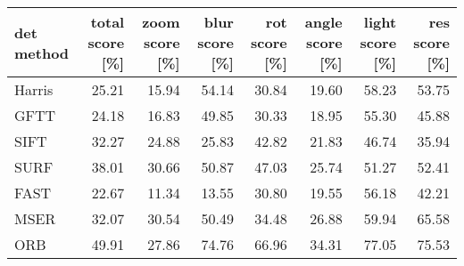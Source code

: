 \begin{tabular}{ l| r r r r r r r }
\label{tab_detperf}
	det method & total score [\%] & zoom score [\%] & blur score [\%] & rot score [\%] & angle score [\%] & light score [\%] & res score [\%] \\
	\hline
	 Harris & 25.21 & 15.94 & 54.14 & 30.84 & 19.60 & 58.23 & 53.75 \\
	 GFTT & 24.18 & 16.83 & 49.85 & 30.33 & 18.95 & 55.30 & 45.88 \\
	 SIFT & 32.27 & 24.88 & 25.83 & 42.82 & 21.83 & 46.74 & 35.94 \\
	 SURF & 38.01 & 30.66 & 50.87 & 47.03 & 25.74 & 51.27 & 52.41 \\
	 FAST & 22.67 & 11.34 & 13.55 & 30.80 & 19.55 & 56.18 & 42.21 \\
	 MSER & 32.07 & 30.54 & 50.49 & 34.48 & 26.88 & 59.94 & 65.58 \\
	 ORB & 49.91 & 27.86 & 74.76 & 66.96 & 34.31 & 77.05 & 75.53
\end{tabular}
